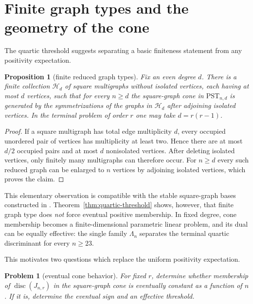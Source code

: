 \documentclass[11pt]{amsart}
\numberwithin{equation}{section}
\newtheorem{proposition}[theorem]{Proposition}
\newtheorem{problem}[theorem]{Problem}
\newcommand{\disc}{\operatorname{disc}}
\begin{document}
\section{Finite graph types and the geometry of the cone}

The quartic threshold suggests separating a basic finiteness statement from
any positivity expectation.

\begin{proposition}[finite reduced graph types]\label{prop:finite-types}
Fix an even degree $d$.  There is a finite collection $\mathcal H_d$ of
square multigraphs without isolated vertices, each having at most $d$
vertices, such that for every $n\ge d$ the square-graph cone in
$\mathrm{PST}_{n,d}$ is generated by the symmetrizations of the graphs in
$\mathcal H_d$ after adjoining isolated vertices.  In the terminal problem of
order $r$ one may take $d=r(r-1)$.
\end{proposition}

\begin{proof}
If a square multigraph has total edge multiplicity $d$, every occupied
unordered pair of vertices has multiplicity at least two.  Hence there are at
most $d/2$ occupied pairs and at most $d$ nonisolated vertices.  After deleting
isolated vertices, only finitely many multigraphs can therefore occur.  For
$n\ge d$ every such reduced graph can be enlarged to $n$ vertices by adjoining
isolated vertices, which proves the claim.
\end{proof}

This elementary observation is compatible with the stable square-graph bases
constructed in \cite{AS}.  Theorem~\ref{thm:quartic-threshold} shows, however,
that finite graph type does \emph{not} force eventual positive membership.  In
fixed degree, cone membership becomes a finite-dimensional parametric linear
problem, and its dual can be equally effective: the single family
$\Lambda_n$ separates the terminal quartic discriminant for every $n\ge23$.

This motivates two questions which replace the uniform positivity expectation.

\begin{problem}[eventual cone behavior]\label{prob:eventual-cone}
For fixed $r$, determine whether membership of $\disc(J_{n,r})$ in the
square-graph cone is eventually constant as a function of $n$.  If it is,
determine the eventual sign and an effective threshold.
\end{problem}
\end{document}
